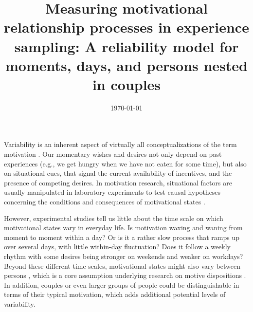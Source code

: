 \documentclass[jou,a4paper,draftfirst]{apa6}\usepackage[]{graphicx}\usepackage[]{color}
\title{Measuring motivational relationship processes in experience sampling: A reliability model for moments, days, and persons nested in couples}
\date{\today}
\begin{document}
\maketitle	%

Variability is an inherent aspect of virtually all conceptualizations of the term motivation \parencite[e.g.,][]{berridge_MotivationConceptsBehavioral_2004,mcclelland_human_1987}.
Our momentary wishes and desires not only depend on past experiences (e.g., we get hungry when we have not eaten for some time), but also on situational cues, that signal the current availability of incentives, and the presence of competing desires. 
In motivation research, situational factors are usually manipulated in laboratory experiments to test causal hypotheses concerning the conditions and consequences of motivational states \parencite{heckhausen_MotivationAction_2018,schultheiss_ImplicitMotives_2010,schultheiss_ImplicitMotives_inpress}. 

However, experimental studies tell us little about the time scale on which motivational states vary in everyday life. Is motivation waxing and waning from moment to moment within a day? Or is it a rather slow process that ramps up over several days, with little within-day fluctuation? Does it follow a weekly rhythm with some desires being stronger on weekends and weaker on workdays? Beyond these different time scales, motivational states might also vary between persons \parencite{fleeson_StructureProcessintegratedView_2001}, which is a core assumption underlying research on motive dispositions \parencite{hagemeyer_abc_2013,schonbrodt_irt_2012,schultheiss_ImplicitMotives_inpress}.
In addition, couples or even larger groups of people could be distinguishable in terms of their typical motivation, which adds additional potential levels of variability.
\end{document}

